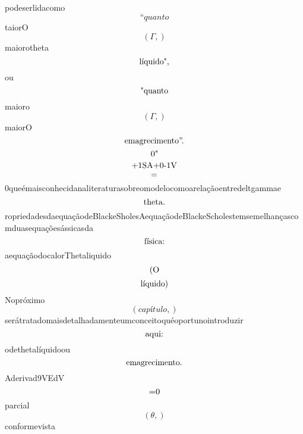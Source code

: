 \documentclass{article}
\begin{document}
\begin{equation}
\end{equation}podeserlidacomo\begin{equation}
“quanto
\end{equation}taiorO\begin{equation}
\left( \Gamma,\right)
\end{equation}maiorotheta\begin{equation}
$líquido",$
\end{equation}ou\begin{equation}
$"quanto$
\end{equation}maioro\begin{equation}
\left( \Gamma,\right)
\end{equation}maiorO\begin{equation}
$emagrecimento”.$
\end{equation}\begin{equation}
$0"$
\end{equation}\begin{equation}
$+1SA+0-1V$
\end{equation}\begin{equation}
$=$
\end{equation}0queémaisconhecidanaliteraturasobreomodelocomoarelaçãoentredeltgammae\begin{equation}
$theta.$
\end{equation}ropriedadesdaequaçãodeBlackeSholesAequaçãodeBlackeScholestemsemelhançascomduasequaçõesássicasda\begin{equation}
$física:$
\end{equation}aequaçãodocalorThetaliquido\begin{equation}
$(O$
\end{equation}\begin{equation}
$líquido)$
\end{equation}Nopróximo\begin{equation}
\left( capítulo,\right)
\end{equation}serátratadomaisdetalhadamenteumconceitoquéoportunointroduzir\begin{equation}
$aqui:$
\end{equation}odethetalíquidoou\begin{equation}
$emagrecimento.$
\end{equation}Aderivad9VEdV\begin{equation}
$=0$
\end{equation}parcial\begin{equation}
\left( \theta,\right)
\end{equation}conformevista\begin{equation}

\end{equation}
\end{document}
